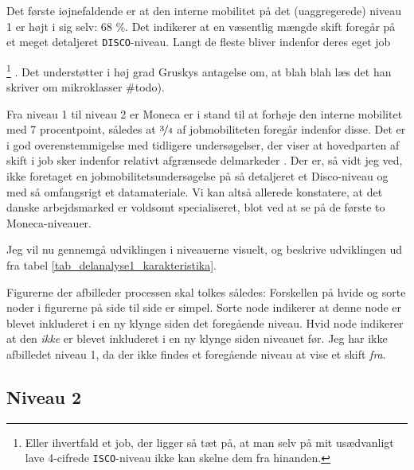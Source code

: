 % 

% 

Det første iøjnefaldende er at den interne mobilitet på det (uaggregerede) niveau 1 er højt i sig selv: 68 \%. Det indikerer at en væsentlig mængde skift foregår på et meget detaljeret \texttt{DISCO}-niveau. Langt de fleste bliver indenfor deres eget job%
%

\footnote{Eller ihvertfald et job, der ligger så tæt på, at man selv på mit usædvanligt lave 4-cifrede \texttt{ISCO}-niveau ikke kan skelne dem fra hinanden.}%
%
. Det understøtter i høj grad Gruskys antagelse om, at blah blah læs det han skriver om mikroklasser \#todo). 

Fra niveau 1 til niveau 2 er Moneca er i stand til at forhøje den interne mobilitet med 7 procentpoint, således at $\nicefrac{3}{4}$ af jobmobiliteten foregår indenfor disse. Det er i god overenstemmigelse med tidligere undersøgelser, der viser at hovedparten af skift i job sker indenfor relativt afgrænsede delmarkeder \parencite[124]{BojeToft1989}. Der er, så vidt jeg ved, ikke foretaget en jobmobilitetsundersøgelse på så detaljeret et Disco-niveau og med så omfangsrigt et datamateriale. Vi kan altså allerede konstatere, at det danske arbejdsmarked er voldsomt specialiseret, blot ved at se på de første to Moneca-niveauer.

Jeg vil nu gennemgå udviklingen i niveauerne visuelt, og beskrive udviklingen ud fra tabel \ref{tab_delanalyse1_karakteristika}.

Figurerne der afbilleder processen skal tolkes således: Forskellen på hvide og sorte noder i figurerne på side \pageref{fig_delanalyse1_kort_seg_proces2} til side \pageref{fig_delanalyse1_kort_seg_proces5} er simpel. Sorte node indikerer at denne node er blevet inkluderet i en ny klynge siden det foregående niveau. Hvid node indikerer at den \emph{ikke} er blevet inkluderet i en ny klynge siden niveauet før. 
Jeg har ikke afbilledet niveau 1, da der ikke findes et foregående niveau at vise et skift \emph{fra}. 


\newpage \subsection{Niveau 2}


